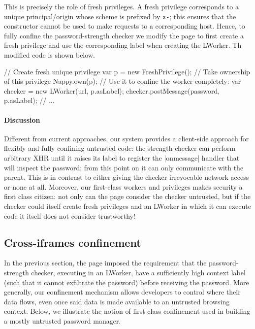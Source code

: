 This is precisely the role of fresh privileges.
%
A fresh privilege corresponds to a unique principal/origin whose
scheme is prefixed by \texttt{x-}; this ensures that the \xhr{}
constructor cannot be used to make requests to a corresponding host.
%
Hence, to fully confine the password-strength checker we modify the
 page to first create a fresh privilege and use the
corresponding label when creating the LWorker.
%
Th modified code is shown below.
\begin{jscode}
// Create fresh unique privilege
var p = new FreshPrivilege();
// Take ownership of this privilege
Nappy.own(p);
// Use it to confine the worker completely:
var checker = new LWorker(url, p.asLabel);
checker.postMessage(password, p.asLabel);
// ...
\end{jscode}
%

%
\paragraph{Discussion}
Different from current approaches, our system provides a client-side
approach for flexibly and fully confining untrusted code:
%
the strength checker can perform arbitrary XHR until it raises its
label to register the \js|onmessage| handler that will inspect the
password; from this point on it can only communicate with the parent.
%
This is in contrast to either giving the checker irrevocable network
access or none at all.
%
Moreover, our first-class workers and privileges makes security a
first class citizen: not only can the page consider the checker
untrusted, but if the checker could itself create fresh privileges and
an LWorker in which it can execute code it itself does not consider
trustworthy!

\subsection{Cross-iframes confinement}
\label{sec:system:iframe}

In the previous section, the  page imposed the
requirement that the password-strength checker, executing in an
LWorker, have a sufficiently high context label (such that it cannot
exfiltrate the password) before receiving the password.
%
More generally, our confinement mechanism allows developers to control
where their data flows, even once said data is made available to an
untrusted browsing context.
%
Below, we illustrate the notion of first-class confinement used
in building a mostly untrusted password manager.

